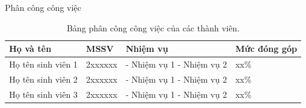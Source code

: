 \begin{preface}{Phân công công việc}
  \begin{table}[h]
    \centering
    \renewcommand{\arraystretch}{1.4}
    \begin{tabular}{|p{4.2cm}|p{2.4cm}|p{6.2cm}|p{2.4cm}|}
      \hline
      \textbf{Họ và tên} & \textbf{MSSV} & \textbf{Nhiệm vụ} & \textbf{Mức đóng góp} \\
      \hline
      Họ tên sinh viên 1 & 2xxxxxx & - Nhiệm vụ 1 \newline - Nhiệm vụ 2 & xx\% \\
      \hline
      Họ tên sinh viên 2 & 2xxxxxx & - Nhiệm vụ 1 \newline - Nhiệm vụ 2 & xx\% \\
      \hline
      Họ tên sinh viên 3 & 2xxxxxx & - Nhiệm vụ 1 \newline - Nhiệm vụ 2 & xx\% \\
      \hline
    \end{tabular}
    \caption*{Bảng phân công công việc của các thành viên.}
  \end{table}
\end{preface}
